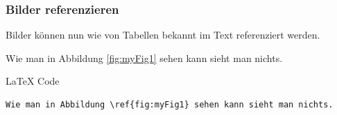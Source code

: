 \begin{frame}[fragile]
	\frametitle{Bilder referenzieren}

	Bilder können nun wie von Tabellen bekannt im Text referenziert werden.
	\pause
	\begin{example}
		Wie man in Abbildung \ref{fig:myFig1} sehen kann sieht man nichts.
	\end{example}
	\pause
	\begin{block}{LaTeX Code}
		\begin{verbatim}
Wie man in Abbildung \ref{fig:myFig1} sehen kann sieht man nichts.
		\end{verbatim}
	\end{block}
\end{frame}







